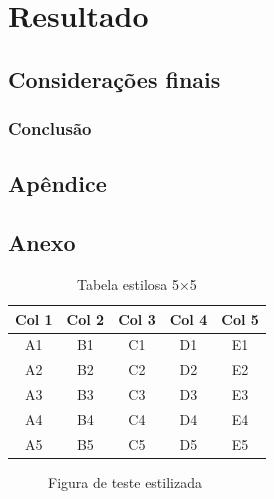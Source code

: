 \documentclass{Arquivos/TrabalhoAcademico}
\begin{document}
\part{Resultado} %
\chapter{Considerações finais}
\section{Conclusão}


\postextual %


\printbibliography[heading=none]


\inicioApendices
\chapter{Apêndice}


\inicioAnexos
\chapter{Anexo}

\begin{table}[ht]
    \centering
    \caption{Tabela estilosa 5×5}
    \label{tab:estilosa}
    \begin{tabular}{ccccc}
        \toprule
        Col 1 & Col 2 & Col 3 & Col 4 & Col 5 \\
        \midrule
        A1 & B1 & C1 & D1 & E1 \\
        A2 & B2 & C2 & D2 & E2 \\
        A3 & B3 & C3 & D3 & E3 \\
        A4 & B4 & C4 & D4 & E4 \\
        A5 & B5 & C5 & D5 & E5 \\
        \bottomrule
    \end{tabular}
\end{table}

\begin{figure}[ht]
    \centering
    \caption{Figura de teste estilizada}
    \label{fig:teste-estilosa}
\end{figure}
\end{document}
